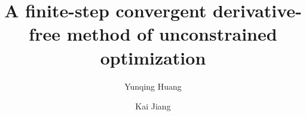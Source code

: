 \documentclass[final,1p,times]{elsarticle}
\begin{document}
\begin{frontmatter}

\title{A finite-step convergent derivative-free method of unconstrained optimization}




\author[xtu]{Yunqing Huang }


\author[xtu]{Kai Jiang }


\address[xtu]{School of Mathematics and Computational
 Science, 
 \\
Hunan Key Laboratory for Computation and Simulation in Science
and Engineering, Xiangtan University, P.R. China, 411105
 }




\end{frontmatter}
\end{document}
